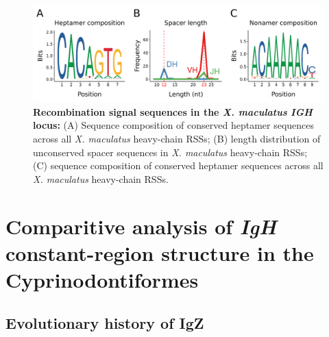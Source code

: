 	\begin{figure}
		\begin{subfigure}{0em}
        \label{fig:xma-rss-seqlogo-all-heptamer}
    \end{subfigure}
    \begin{subfigure}{0em}
        \label{fig:xma-rss-seqlogo-all-spacer}
    \end{subfigure}
    \begin{subfigure}{0em}
        \label{fig:xma-rss-seqlogo-all-nonamer}
    \end{subfigure}
	\includegraphics[width=\textwidth]{_Figures/png/xma-rss-seqlogo-all}
	\caption[Recombination signal sequences in the \textit{X. maculatus} \textit{IGH} locus]{\textbf{Recombination signal sequences in the \textit{X. maculatus} \textit{IGH} locus:} (A) Sequence composition of conserved heptamer sequences across all \textit{X. maculatus} heavy-chain RSSs; (B) length distribution of unconserved spacer sequences in \textit{X. maculatus} heavy-chain RSSs; (C) sequence composition of conserved heptamer sequences across all \textit{X. maculatus} heavy-chain RSSs.}
	\label{fig:xma-rss-seqlogo-all}
	\end{figure}



\section{Comparitive analysis of \textit{IgH} constant-region structure in the Cyprinodontiformes}
\label{sec:comparative-loci}

	\subsection{Evolutionary history of IgZ}
	
